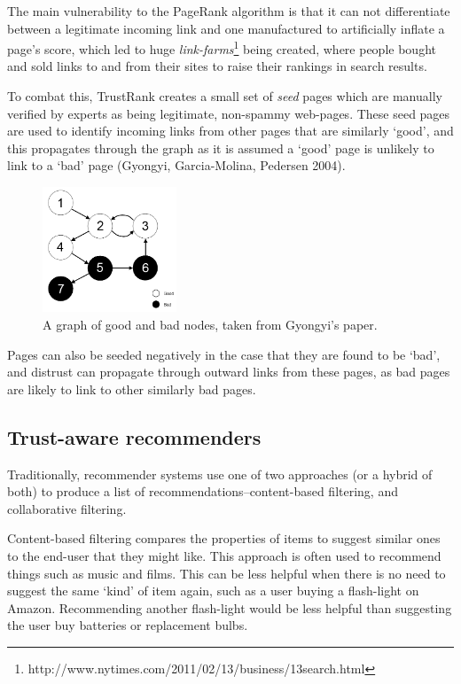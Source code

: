 \documentclass[]{final_report}
\begin{document}
The main vulnerability to the PageRank algorithm is that it can not differentiate between a legitimate incoming link and one manufactured to artificially inflate a page's score, which led to huge \textsl{link-farms}\footnote{http://www.nytimes.com/2011/02/13/business/13search.html} being created, where people bought and sold links to and from their sites to raise their rankings in search results. 

To combat this, TrustRank creates a small set of \textsl{seed} pages which are manually verified by experts as being legitimate, non-spammy web-pages. These seed pages are used to identify incoming links from other pages that are similarly `good', and this propagates through the graph as it is assumed a `good' page is unlikely to link to a `bad' page (Gyongyi, Garcia-Molina, Pedersen 2004).

\begin{figure}[ht!]
\centering
\includegraphics[width=40mm]{trustrank.png}
\caption{A graph of good and bad nodes, taken from Gyongyi's paper.}
\end{figure}

Pages can also be seeded negatively in the case that they are found to be `bad', and distrust can propagate through outward links from these pages, as bad pages are likely to link to other similarly bad pages.

\subsection{Trust-aware recommenders}

Traditionally, recommender systems use one of two approaches (or a hybrid of both) to produce a list of recommendations--content-based filtering, and collaborative filtering. 

Content-based filtering compares the properties of items to suggest similar ones to the end-user that they might like. This approach is often used to recommend things such as music and films. This can be less helpful when there is no need to suggest the same `kind' of item again, such as a user buying a flash-light on Amazon. Recommending another flash-light would be less helpful than suggesting the user buy batteries or replacement bulbs.
\end{document}
